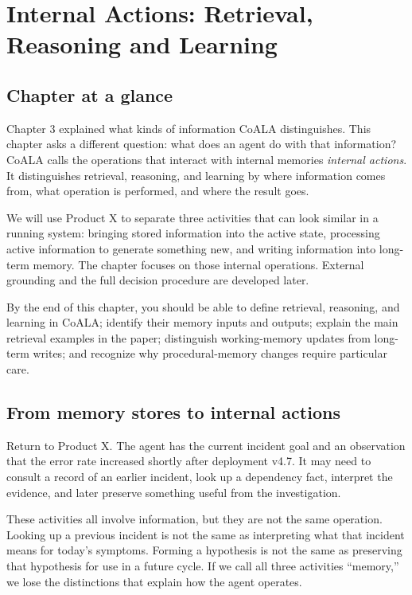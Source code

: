 \chapter{Internal Actions: Retrieval, Reasoning and Learning}
\label{ch:internal-actions}

\section*{Chapter at a glance}
{}

Chapter 3 explained what kinds of information CoALA distinguishes. This chapter asks a different question: what does an agent do with that information? CoALA calls the operations that interact with internal memories \emph{internal actions}. It distinguishes retrieval, reasoning, and learning by where information comes from, what operation is performed, and where the result goes.

We will use Product X to separate three activities that can look similar in a running system: bringing stored information into the active state, processing active information to generate something new, and writing information into long-term memory. The chapter focuses on those internal operations. External grounding and the full decision procedure are developed later.

\begin{learningbox}
By the end of this chapter, you should be able to define retrieval, reasoning, and learning in CoALA; identify their memory inputs and outputs; explain the main retrieval examples in the paper; distinguish working-memory updates from long-term writes; and recognize why procedural-memory changes require particular care.
\end{learningbox}

\section{From memory stores to internal actions}
\label{sec:from-memory-to-actions}

Return to Product X. The agent has the current incident goal and an observation that the error rate increased shortly after deployment v4.7. It may need to consult a record of an earlier incident, look up a dependency fact, interpret the evidence, and later preserve something useful from the investigation.

These activities all involve information, but they are not the same operation. Looking up a previous incident is not the same as interpreting what that incident means for today's symptoms. Forming a hypothesis is not the same as preserving that hypothesis for use in a future cycle. If we call all three activities ``memory,'' we lose the distinctions that explain how the agent operates.

